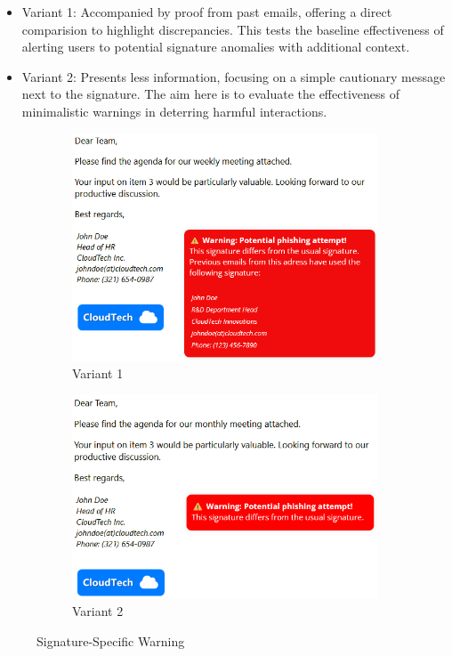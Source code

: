 \documentclass[
  a4paper,  %
  twoside,  %
  bibliography=totoc,
  headsepline,
  cleardoublepage=empty,
  parskip=half,
  draft=false
]{scrbook}
\begin{document}
\begin{itemize}
    \item Variant 1: Accompanied by proof from past emails, offering a direct comparision to highlight discrepancies. This tests the baseline effectiveness of alerting users to potential signature anomalies with additional context.
    \item Variant 2: Presents less information, focusing on a simple cautionary message next to the signature. The aim here is to evaluate the effectiveness of minimalistic warnings in deterring harmful interactions.
\end{itemize}

\begin{figure} [H]
\centering
\begin{subfigure}{.5\textwidth}
  \centering
  \includegraphics[width=.9\linewidth]{study//conditions/signature1.png}
  \caption{Variant 1}
  \label{fig:sig1}
\end{subfigure}%
\begin{subfigure}{.5\textwidth}
  \centering
  \includegraphics[width=.9\linewidth]{study//conditions/signature2.png}
  \caption{Variant 2}
  \label{fig:sig2}
\end{subfigure}
\caption{Signature-Specific Warning}
\label{fig:signature}
\end{figure}
\end{document}
